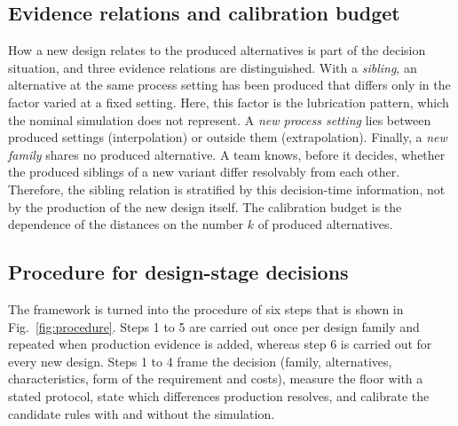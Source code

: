 \documentclass[pdflatex,sn-basic,lineno]{sn-jnl}
\begin{document}
\subsection{Evidence relations and calibration budget}\label{sec:budget}

How a new design relates to the produced alternatives is part of the decision situation, and three evidence relations are distinguished. With a \emph{sibling}, an alternative at the same process setting has been produced that differs only in the factor varied at a fixed setting. Here, this factor is the lubrication pattern, which the nominal simulation does not represent. A \emph{new process setting} lies between produced settings (interpolation) or outside them (extrapolation). Finally, a \emph{new family} shares no produced alternative. A team knows, before it decides, whether the produced siblings of a new variant differ resolvably from each other. Therefore, the sibling relation is stratified by this decision-time information, not by the production of the new design itself. The calibration budget is the dependence of the distances on the number $k$ of produced alternatives.

\subsection{Procedure for design-stage decisions}\label{sec:procedure}

The framework is turned into the procedure of six steps that is shown in Fig.~\ref{fig:procedure}. Steps 1 to 5 are carried out once per design family and repeated when production evidence is added, whereas step 6 is carried out for every new design. Steps 1 to 4 frame the decision (family, alternatives, characteristics, form of the requirement and costs), measure the floor with a stated protocol, state which differences production resolves, and calibrate the candidate rules with and without the simulation.
\end{document}
